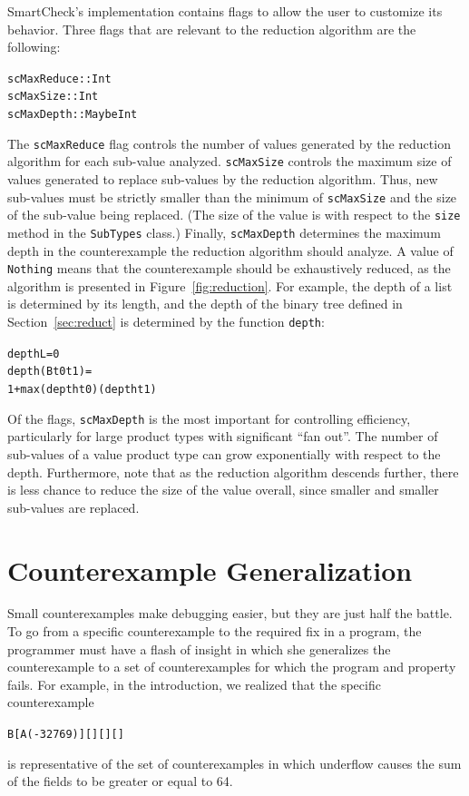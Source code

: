 \documentclass[10pt]{sigplanconf}
\newenvironment{code}{\begin{alltt}\small}{\end{alltt}}
\newcommand{\ttp}[1]{\texttt{#1}}
\begin{document}
SmartCheck's implementation contains flags to allow the user to customize its
behavior.  Three flags that are relevant to the reduction algorithm are the
following:
%
\begin{code}
scMaxReduce :: Int
scMaxSize   :: Int
scMaxDepth  :: Maybe Int
\end{code}
%
\noindent
The \ttp{scMaxReduce} flag controls the number of values generated by the
reduction algorithm for each sub-value analyzed.  \ttp{scMaxSize} controls the
maximum size of values generated to replace sub-values by the reduction
algorithm.  Thus, new sub-values must be strictly smaller than the minimum of
\ttp{scMaxSize} and the size of the sub-value being replaced.  (The size of the
value is with respect to the \ttp{size} method in the \ttp{SubTypes} class.)
Finally, \ttp{scMaxDepth} determines the maximum depth in the counterexample the
reduction algorithm should analyze.  A value of \ttp{Nothing} means that the
counterexample should be exhaustively reduced, as the algorithm is presented in
Figure~\ref{fig:reduction}.  For example, the depth of a list is determined by
its length, and the depth of the binary tree defined in Section~\ref{sec:reduct}
is determined by the function \ttp{depth}:
%
\begin{code}
depth L         = 0
depth (B t0 t1) =
  1 + max (depth t0) (depth t1)
\end{code}
%
\noindent
Of the flags, \ttp{scMaxDepth} is the most important for controlling
efficiency, particularly for large product types with significant ``fan out''.
The number of sub-values of a value product type can grow exponentially with
respect to the depth.  Furthermore, note that as the reduction algorithm
descends further, there is less chance to reduce the size of the value overall,
since smaller and smaller sub-values are replaced.

\section{Counterexample Generalization}\label{sec:generalization}

Small counterexamples make debugging easier, but they are just half the battle.
To go from a specific counterexample to the required fix in a program, the
programmer must have a flash of insight in which she generalizes the
counterexample to a set of counterexamples for which the program and property
fails.  For example, in the introduction, we realized that the specific
counterexample
%
\begin{code}
B [A (-32769)] [] [] []
\end{code}
%
\noindent
is representative of the set of counterexamples in which underflow causes the
sum of the fields to be greater or equal to 64.
\end{document}
